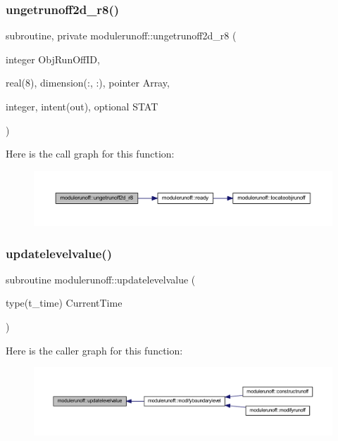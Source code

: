 \subsubsection{\texorpdfstring{ungetrunoff2d\+\_\+r8()}{ungetrunoff2d\_r8()}}
{\footnotesize\ttfamily subroutine, private modulerunoff\+::ungetrunoff2d\+\_\+r8 (\begin{DoxyParamCaption}\item[{integer}]{Obj\+Run\+Off\+ID,  }\item[{real(8), dimension(\+:, \+:), pointer}]{Array,  }\item[{integer, intent(out), optional}]{S\+T\+AT }\end{DoxyParamCaption})\hspace{0.3cm}{\ttfamily [private]}}

Here is the call graph for this function\+:\nopagebreak
\begin{figure}[H]
\begin{center}
\leavevmode
\includegraphics[width=350pt]{namespacemodulerunoff_af00779fc9a81a3cdf2947f1c7990d1c8_cgraph}
\end{center}
\end{figure}
\mbox{\label{namespacemodulerunoff_a420154ccf7d67c95702222f4b56fb5fa}} 
\subsubsection{\texorpdfstring{updatelevelvalue()}{updatelevelvalue()}}
{\footnotesize\ttfamily subroutine modulerunoff\+::updatelevelvalue (\begin{DoxyParamCaption}\item[{type(t\+\_\+time)}]{Current\+Time }\end{DoxyParamCaption})\hspace{0.3cm}{\ttfamily [private]}}

Here is the caller graph for this function\+:\nopagebreak
\begin{figure}[H]
\begin{center}
\leavevmode
\includegraphics[width=350pt]{namespacemodulerunoff_a420154ccf7d67c95702222f4b56fb5fa_icgraph}
\end{center}
\end{figure}
\mbox{\label{namespacemodulerunoff_ae21623961ce63cf7c148437e7ad9d934}} 
